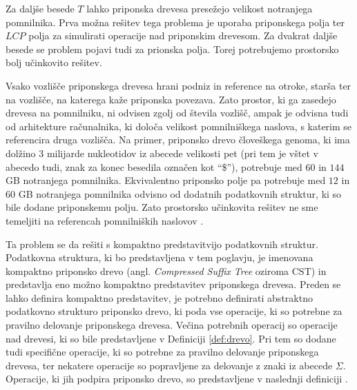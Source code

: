 Za daljše besede $T$ lahko priponska drevesa presežejo velikost notranjega pomnilnika. Prva možna rešitev tega problema je uporaba priponskega polja ter $LCP$ polja za simulirati operacije nad priponskim drevesom. Za dvakrat daljše besede se problem pojavi tudi za prionska polja. Torej potrebujemo prostorsko bolj učinkovito rešitev. 

Vsako vozlišče priponskega drevesa hrani podniz in reference na otroke, starša ter na vozlišče, na katerega kaže priponska povezava. Zato prostor, ki ga zasedejo drevesa na pomnilniku, ni odvisen zgolj od števila vozlišč, ampak je odvisna tudi od arhitekture računalnika, ki določa velikost pomnilniškega naslova, s katerim se referencira druga vozlišča. Na primer, priponsko drevo človeškega genoma, ki ima dolžino 3 milijarde nukleotidov iz abecede velikosti pet (pri tem je vštet v abecedo tudi, znak za konec besedila označen kot \enquote{\$}), potrebuje med $60$ in $144$ GB notranjega pomnilnika. Ekvivalentno priponsko polje pa potrebuje med $12$ in $60$ GB notranjega pomnilnika odvisno od dodatnih podatkovnih struktur, ki so bile dodane priponskemu polju. Zato prostorsko učinkovita rešitev ne sme temeljiti na referencah pomnilniških naslovov \cite{GENOMEKNOWLEDGEHUB-2024-10-30}.

Ta problem se da rešiti s kompaktno predstavitvijo podatkovnih struktur. Podatkovna struktura, ki bo predstavljena v tem poglavju, je imenovana kompaktno priponsko drevo (angl. \textit{Compressed Suffix Tree} oziroma CST) in predstavlja eno možno kompaktno predstavitev priponskega drevesa. Preden se lahko definira kompaktno predstavitev, je potrebno definirati abstraktno podatkovno strukturo priponsko drevo, ki poda vse operacije, ki so potrebne za pravilno delovanje priponskega drevesa. Večina potrebnih operacij so operacije nad drevesi, ki so bile predstavljene v Definiciji \ref{def:drevo}. Pri tem so dodane tudi specifične operacije, ki so potrebne za pravilno delovanje priponskega drevesa, ter nekatere operacije so popravljene za delovanje z znaki iz abecede $\Sigma$. Operacije, ki jih podpira priponsko drevo, so predstavljene v naslednji definiciji \cite{Sadakane2007}.

